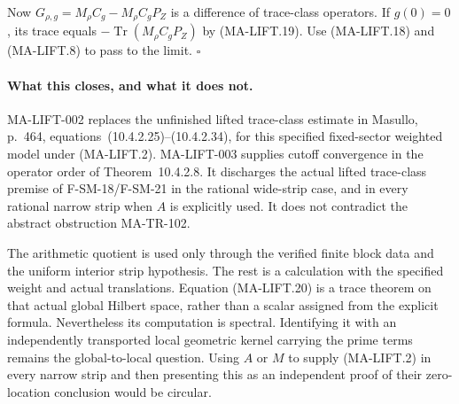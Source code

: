 Now $G_{\rho,g}=M_\rho C_g-M_\rho C_gP_Z$ is a difference of
trace-class operators. If $g(0)=0$, its trace equals
$-\operatorname{Tr}(M_\rho C_gP_Z)$ by (MA-LIFT.19).
Use (MA-LIFT.18) and (MA-LIFT.8) to pass to the limit.
\hfill$\square$

\paragraph{What this closes, and what it does not.}
MA-LIFT-002 replaces the unfinished lifted trace-class estimate
in Masullo, p.~464, equations~(10.4.2.25)--(10.4.2.34), for this
specified fixed-sector weighted model under (MA-LIFT.2).
MA-LIFT-003 supplies cutoff convergence in the operator order
of Theorem~10.4.2.8. It discharges the actual lifted trace-class
premise of F-SM-18/F-SM-21 in the rational wide-strip case, and
in every rational narrow strip when $A$ is explicitly used.
It does not contradict the abstract obstruction MA-TR-102.

The arithmetic quotient is used only through the verified
finite block data and the uniform interior strip hypothesis.
The rest is a calculation with the specified weight and actual
translations. Equation (MA-LIFT.20) is a trace theorem on that
actual global Hilbert space, rather than a scalar assigned from
the explicit formula. Nevertheless its computation is spectral.
Identifying it with an independently transported local geometric
kernel carrying the prime terms remains the global-to-local
question. Using $A$ or $M$ to supply (MA-LIFT.2) in every narrow
strip and then presenting this as an independent proof of their
zero-location conclusion would be circular.

